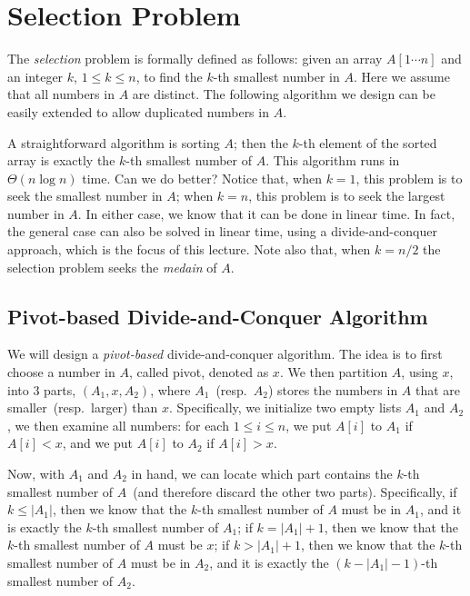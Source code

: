 \setcounter{definition}{0} \setcounter{property}{0} \setcounter{claim}{0} \setcounter{fact}{0} \setcounter{corollary}{0} \setcounter{figure}{0}
\section{Selection Problem}

The \emph{selection} problem is formally defined as follows: given an array $A[1\cdots n]$ and
an integer $k$, $1 \le k \le n$, to find the $k$-th smallest number in $A$.
Here we assume that all numbers in $A$ are distinct. The following algorithm
we design can be easily extended to allow duplicated numbers in $A$.

A straightforward algorithm is sorting $A$; then the $k$-th element of the sorted array is exactly
the $k$-th smallest number of $A$. This algorithm runs in $\Theta(n\log n)$ time. Can we do better?
Notice that, when $k = 1$, this problem is to seek the smallest number in $A$;
when $k = n$, this problem is to seek the largest number in $A$.
In either case, we know that it can be done in linear time.
In fact, the general case can also be solved in linear time, using a divide-and-conquer approach, which is the focus of this lecture.
Note also that, when $k = n/2$ the selection problem seeks the \emph{medain} of $A$.

\subsection*{Pivot-based Divide-and-Conquer Algorithm}

We will design a \emph{pivot-based} divide-and-conquer algorithm.
The idea is to first choose a number in $A$, called pivot, denoted as $x$.
We then partition $A$, using $x$, into 3 parts, $(A_1, x, A_2)$, where $A_1$~(resp.\ $A_2$) stores the numbers in $A$
that are smaller~(resp.\ larger) than $x$.
Specifically, we initialize two empty lists $A_1$ and $A_2$,
we then examine all numbers: for each $1\le i \le n$, we put $A[i]$ to $A_1$ if $A[i] < x$,
and we put $A[i]$ to $A_2$ if $A[i] > x$.

Now, with $A_1$ and $A_2$ in hand, we can locate which part contains the $k$-th smallest number of $A$~(and therefore discard the other two parts).
Specifically, if $k \le |A_1|$, then we know that the $k$-th smallest number of $A$ must be in $A_1$,
and it is exactly the $k$-th smallest number of $A_1$;
if $k = |A_1| + 1$, then we know that the $k$-th smallest number of $A$ must be $x$;
if $k > |A_1| + 1$, then we know that the $k$-th smallest number of $A$ must be in $A_2$,
and it is exactly the $(k-|A_1|-1)$-th smallest number of $A_2$.

